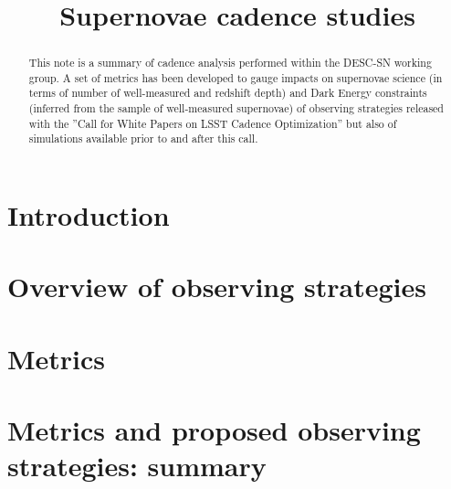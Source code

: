 \documentclass[\docopts]{\docclass}
\begin{document}
\title{Supernovae cadence studies}

\maketitlepre


\begin{abstract}

 This note is a summary of cadence analysis performed within the DESC-SN working group.  A set of metrics has been developed to gauge impacts on supernovae science (in terms of number of well-measured and redshift depth) and Dark Energy constraints (inferred from the sample of well-measured supernovae) of observing strategies released with the ''Call for White Papers on LSST Cadence Optimization'' but also of simulations available prior to and after this call. 
\end{abstract}

\dockeys{}

\maketitlepost

\clearpage
\tableofcontents

\section{Introduction}
\label{sec:intro}



\section{Overview of observing strategies}
\label{sec:overview}



\section{Metrics}
\label{sec:metricsmain}














\section{Metrics and proposed observing strategies: summary}
\label{sec:summary}

\end{document}
